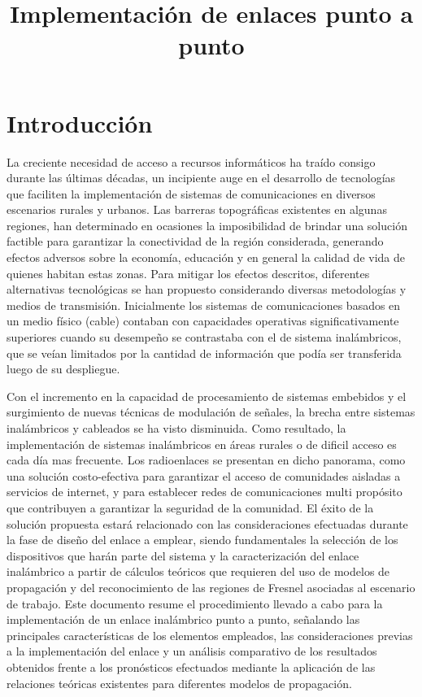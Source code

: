 \documentclass[conference]{IEEEtran}
\begin{document}
\title{Implementación de enlaces punto a punto
}

\author{
}
\maketitle

\section{Introducción}
La creciente necesidad de acceso a recursos informáticos ha traído consigo durante las últimas décadas,
un incipiente auge en el desarrollo de tecnologías que faciliten la implementación de sistemas de comunicaciones
en diversos escenarios rurales y urbanos. Las barreras topográficas existentes en algunas regiones, han determinado
en ocasiones la imposibilidad de brindar una solución factible para garantizar la conectividad de la región considerada, 
generando efectos adversos sobre la economía, educación y en general la calidad de vida de quienes habitan estas zonas.
Para mitigar los efectos descritos, diferentes alternativas tecnológicas se han propuesto considerando diversas metodologías
y medios de transmisión. Inicialmente los sistemas de comunicaciones basados en un medio físico (cable) contaban con capacidades
operativas significativamente superiores cuando su desempeño se contrastaba con el de sistema inalámbricos, que se veían limitados
por la cantidad de información que podía ser transferida luego de su despliegue. 

Con el incremento en la capacidad de procesamiento de sistemas embebidos y el surgimiento de nuevas técnicas de modulación de 
señales, la brecha entre sistemas inalámbricos y cableados se ha visto disminuida. Como resultado, la implementación de sistemas 
inalámbricos en áreas rurales o de dificil acceso es cada día mas frecuente. Los radioenlaces se presentan en dicho panorama, 
como una solución costo-efectiva para garantizar el acceso de comunidades aisladas a servicios de internet, y para establecer redes de 
comunicaciones multi propósito que contribuyen a garantizar la seguridad de la comunidad. El éxito de la solución propuesta estará 
relacionado con las consideraciones efectuadas durante la fase de diseño del enlace a emplear, siendo fundamentales la selección de los 
dispositivos que harán parte del sistema y la caracterización del enlace inalámbrico a partir de cálculos teóricos que requieren del uso 
de modelos de propagación y del reconocimiento de las regiones de Fresnel asociadas al escenario de trabajo. Este documento resume el procedimiento
llevado a cabo para la implementación de un enlace inalámbrico punto a punto, señalando las principales características de los elementos empleados,
las consideraciones previas a la implementación del enlace y un análisis comparativo de los resultados obtenidos frente a los pronósticos 
efectuados mediante la aplicación de las relaciones teóricas existentes para diferentes modelos de propagación.
\end{document}
